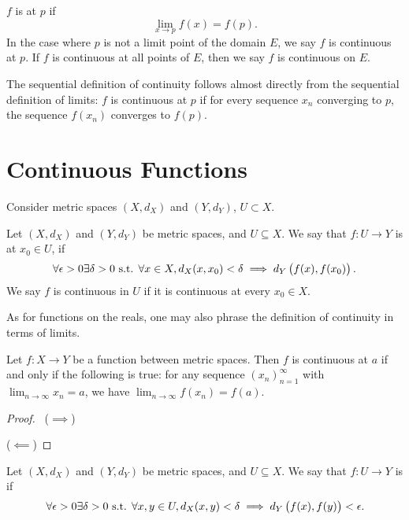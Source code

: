 \begin{definition}
$f$ is  at $p$ if
\[ \lim_{x\to p}f(x) = f(p). \]
In the case where $p$ is not a limit point of the domain $E$, we say $f$ is continuous at $p$. If $f$ is continuous at all points of $E$, then we say $f$ is continuous on $E$.
\end{definition}

The sequential definition of continuity follows almost directly from the sequential definition of limits: 
$f$ is continuous at $p$ if for every sequence $x_n$ converging to $p$, the sequence $f(x_n)$ converges to $f(p)$.



\section{Continuous Functions}
Consider metric spaces $(X,d_X)$ and $(Y,d_Y)$, $U\subset X$.

\begin{definition}[Continuity]
Let $(X,d_X)$ and $(Y,d_Y)$ be metric spaces, and $U\subseteq X$. We say that $f:U\to Y$ is  at $x_0\in U$, if 
\[\forall\epsilon>0\exists\delta>0\text{ s.t. }\forall x\in X,d_X(x,x_0)<\delta\implies d_Y\left(f(x),f(x_0)\right).\]
We say $f$ is continuous in $U$ if it is continuous at every $x_0\in X$.
\end{definition}

As for functions on the reals, one may also phrase the definition of continuity
in terms of limits.

\begin{lemma}
Let $f:X\to Y$ be a function between metric spaces. Then $f$ is continuous at $a$ if and only if the following is true: for any sequence $(x_n)_{n=1}^\infty$ with $\lim_{n\to\infty}x_n=a$, we have $\lim_{n\to\infty}f(x_n)=f(a)$.
\end{lemma}

\begin{proof} \
($\implies$)

($\impliedby$)
\end{proof}

\begin{definition}
Let $(X,d_X)$ and $(Y,d_Y)$ be metric spaces, and $U\subseteq X$. We say that $f:U\to Y$ is  if
\[\forall\epsilon>0\exists\delta>0\text{ s.t. }\forall x,y\in U,d_X(x,y)<\delta\implies d_Y\left(f(x),f(y)\right)<\epsilon.\]
\end{definition}

